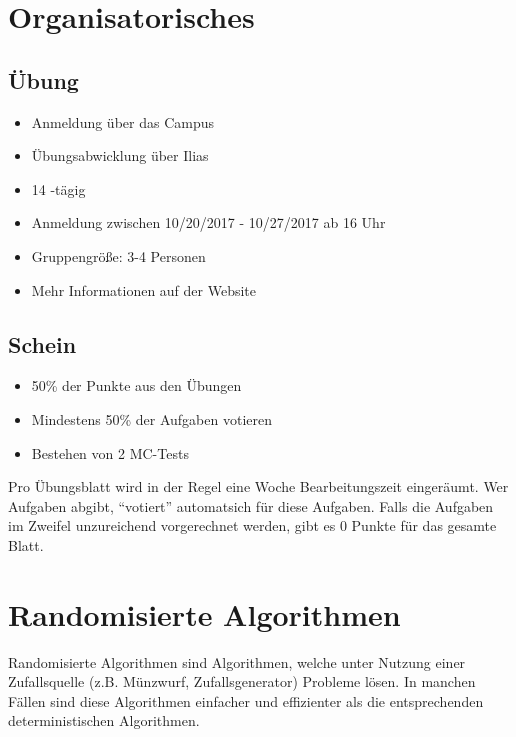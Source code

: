 \documentclass{scrartcl}%
\begin{document}
    \section*{Organisatorisches}
    \label{sec:organisatorisches}

    \subsection*{Übung}
    \label{subsec:übung}

    \begin{itemize}
        \item Anmeldung über das Campus
        \item Übungsabwicklung über Ilias
        \item 14 -tägig
        \item Anmeldung zwischen 10/20/2017 - 10/27/2017 ab 16 Uhr
        \item Gruppengröße: 3-4 Personen
        \item Mehr Informationen auf der Website
    \end{itemize}

    \subsection*{Schein}
    \label{subsec:schein}

    \begin{itemize}
        \item 50\% der Punkte aus den Übungen
        \item Mindestens 50\% der Aufgaben votieren
        \item Bestehen von 2 MC-Tests
    \end{itemize}

    Pro Übungsblatt wird in der Regel eine Woche Bearbeitungszeit eingeräumt.
    Wer Aufgaben abgibt, "`votiert"' automatsich für diese Aufgaben.
    Falls die Aufgaben im Zweifel unzureichend vorgerechnet werden,
    gibt es 0 Punkte für das gesamte Blatt.

    \section*{Randomisierte Algorithmen}
    \label{sec:randomisierteAlgorithmen}

    Randomisierte Algorithmen sind Algorithmen,
    welche unter Nutzung einer Zufallsquelle (z.B. Münzwurf, Zufallsgenerator) Probleme lösen.
    In manchen Fällen sind diese Algorithmen einfacher und effizienter
    als die entsprechenden deterministischen Algorithmen.
\end{document}
